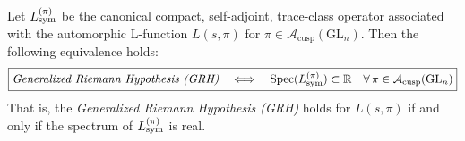 \begin{corollary}
\label{cor:grh_real_equiv_spectral_reality}

Let \( L_{\mathrm{sym}}^{(\pi)} \) be the canonical compact, self-adjoint, trace-class operator associated with the automorphic L-function \( L(s, \pi) \) for \( \pi \in \mathcal{A}_{\text{cusp}}(\mathrm{GL}_n) \). Then the following equivalence holds:
\[
\boxed{
\textit{Generalized Riemann Hypothesis (GRH)} \quad \Longleftrightarrow \quad \operatorname{Spec}(L_{\mathrm{sym}}^{(\pi)}) \subset \mathbb{R} \quad \forall \, \pi \in \mathcal{A}_{\text{cusp}}(\mathrm{GL}_n)
}
\]
That is, the \emph{Generalized Riemann Hypothesis (GRH)} holds for \( L(s, \pi) \) if and only if the spectrum of \( L_{\mathrm{sym}}^{(\pi)} \) is real.

\end{corollary}
